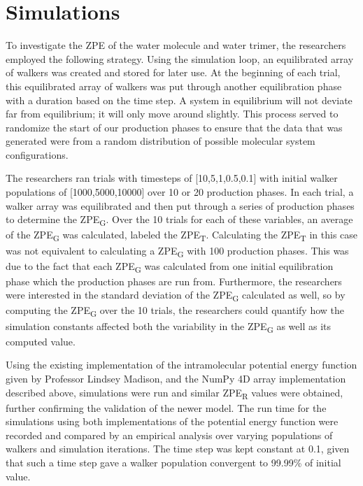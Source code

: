 \documentclass[journal=jacsat,manuscript=article]{achemso}
\begin{document}
\section{Simulations}

To investigate the ZPE of the water molecule and water trimer, the researchers employed the following strategy. Using the simulation loop, an equilibrated array of walkers was created and stored for later use. At the beginning of each trial, this equilibrated array of walkers was put through another equilibration phase with a duration based on the time step. A system in equilibrium will not deviate far from equilibrium; it will only move around slightly. This process served to randomize the start of our production phases to ensure that the data that was generated were from a random distribution of possible molecular system configurations.

The researchers ran trials with timesteps of [10,5,1,0.5,0.1] with initial walker populations of [1000,5000,10000] over 10 or 20 production phases. In each trial, a walker array was equilibrated and then put through a series of production phases to determine the ZPE\textsubscript{G}. Over the 10 trials for each of these variables, an average of the ZPE\textsubscript{G} was calculated, labeled the ZPE\textsubscript{T}. Calculating the ZPE\textsubscript{T} in this case was not equivalent to calculating a ZPE\textsubscript{G} with 100 production phases. This was due to the fact that each ZPE\textsubscript{G} was calculated from one initial equilibration phase which the production phases are run from. Furthermore, the researchers were interested in the standard deviation of the ZPE\textsubscript{G} calculated as well, so by computing the ZPE\textsubscript{G} over the 10 trials, the researchers could quantify how the simulation constants affected both the variability in the ZPE\textsubscript{G} as well as its computed value.

Using the existing implementation of the intramolecular potential energy function given by Professor Lindsey Madison, and the NumPy 4D array implementation described above, simulations were run and similar ZPE\textsubscript{R} values were obtained, further confirming the validation of the newer model. The run time for the simulations using both implementations of the potential energy function were recorded and compared by an empirical analysis over varying populations of walkers and simulation iterations. The time step was kept constant at 0.1, given that such a time step gave a walker population convergent to 99.99\% of initial value.
\end{document}
